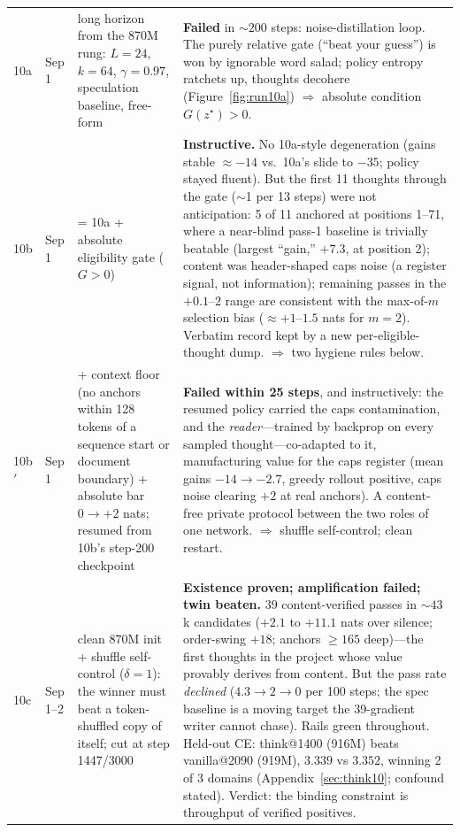 \documentclass{article} %
\newcommand{\thought}{z}
\newcommand{\best}{\thought^{\star}}
\newcommand{\gain}{G}
\begin{document}
{\begin{longtable}{@{}llp{3.6cm}p{5.6cm}@{}}
\addlinespace
10a & Sep 1 & long horizon from the 870M rung: $L{=}24$, $k{=}64$, $\gamma{=}0.97$, speculation baseline, free-form & \textbf{Failed} in ${\sim}200$ steps: noise-distillation loop. The purely relative gate (``beat your guess'') is won by ignorable word salad; policy entropy ratchets up, thoughts decohere (Figure~\ref{fig:run10a}) $\Rightarrow$ absolute condition $\gain(\best) > 0$. \\
\addlinespace
10b & Sep 1 & = 10a + absolute eligibility gate ($\gain > 0$) & \textbf{Instructive.} No 10a-style degeneration (gains stable ${\approx}{-}14$ vs.\ 10a's slide to $-35$; policy stayed fluent). But the first 11 thoughts through the gate ($\sim$1 per 13 steps) were not anticipation: 5 of 11 anchored at positions 1--71, where a near-blind pass-1 baseline is trivially beatable (largest ``gain,'' $+7.3$, at position 2); content was header-shaped caps noise (a register signal, not information); remaining passes in the $+0.1$--$2$ range are consistent with the max-of-$m$ selection bias (${\approx}{+}1$--$1.5$ nats for $m{=}2$). Verbatim record kept by a new per-eligible-thought dump. $\Rightarrow$ two hygiene rules below. \\
\addlinespace
10b$'$ & Sep 1 & + context floor (no anchors within 128 tokens of a sequence start or document boundary) + absolute bar $0 \to +2$ nats; resumed from 10b's step-200 checkpoint & \textbf{Failed within 25 steps}, and instructively: the resumed policy carried the caps contamination, and the \emph{reader}---trained by backprop on every sampled thought---co-adapted to it, manufacturing value for the caps register (mean gains $-14 \to -2.7$, greedy rollout positive, caps noise clearing $+2$ at real anchors). A content-free private protocol between the two roles of one network. $\Rightarrow$ shuffle self-control; clean restart. \\
\addlinespace
10c & Sep 1--2 & clean 870M init + shuffle self-control ($\delta = 1$): the winner must beat a token-shuffled copy of itself; cut at step 1447/3000 & \textbf{Existence proven; amplification failed; twin beaten.} 39 content-verified passes in ${\sim}43$k candidates ($+2.1$ to $+11.1$ nats over silence; order-swing $+18$; anchors $\ge 165$ deep)---the first thoughts in the project whose value provably derives from content. But the pass rate \emph{declined} ($4.3 \to 2 \to 0$ per 100 steps; the spec baseline is a moving target the 39-gradient writer cannot chase). Rails green throughout. Held-out CE: think@1400 (916M) beats vanilla@2090 (919M), $3.339$ vs $3.352$, winning 2 of 3 domains (Appendix~\ref{sec:think10}; confound stated). Verdict: the binding constraint is throughput of verified positives. \\

\end{longtable}}
\end{document}
